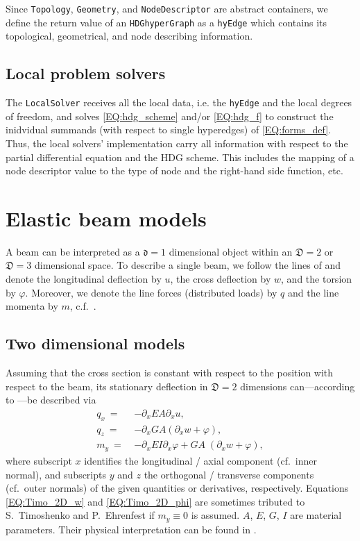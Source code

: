 \documentclass[a4paper, english, 12pt, reqno, draft]{amsart}
\theoremstyle{definition}
\theoremstyle{remark}
\numberwithin{equation}{section}
\newcommand{\locDim}{\ensuremath{\mathfrak d}}
\newcommand{\globDim}{\ensuremath{\mathfrak D}}
\newcommand{\code}[1]{\texttt{#1}}
\newcommand{\longDef}{\ensuremath{u}}
\newcommand{\crossDef}{\ensuremath{w}}
\newcommand{\torsion}{\ensuremath{\varphi}}
\newcommand{\force}{\ensuremath{q}}
\newcommand{\momentum}{\ensuremath{m}}
\begin{document}
Since \code{Topology}, \code{Geometry}, and \code{NodeDescriptor} are abstract containers, we define the return value of an \code{HDGhyperGraph} as a \code{hyEdge} which contains its topological, geometrical, and node describing information.
% 
\subsection{Local problem solvers}
% 
The \code{LocalSolver} receives all the local data, i.e. the \code{hyEdge} and the local degrees of freedom, and solves \eqref{EQ:hdg_scheme} and/or \eqref{EQ:hdg_f} to construct the inidvidual summands (with respect to single hyperedges) of \eqref{EQ:forms_def}. Thus, the local solvers' implementation carry all information with respect to the partial differential equation and the HDG scheme. This includes the mapping of a node descriptor value to the type of node and the right-hand side function, etc.
% 
\section{Elastic beam models}
% 
A beam can be interpreted as a $\locDim = 1$ dimensional object within an $\globDim = 2$ or $\globDim = 3$ dimensional space. To describe a single beam, we follow the lines of \cite[Sect.~1.2.3]{MeskourisH2013} and denote the longitudinal deflection by $\longDef$, the cross deflection by $\crossDef$, and the torsion by $\torsion$. Moreover, we denote the line forces (distributed loads) by $\force$ and the line momenta by $\momentum$, c.f.~\cite[Sect.~1.2.2]{MeskourisH2013}.
% 
\subsection{Two dimensional models}
% 
Assuming that the cross section is constant with respect to the position with respect to the beam, its stationary deflection in $\globDim = 2$ dimensions can---according to \cite[Sect.~1.4.3]{MeskourisH2013}---be described via
% 
\begin{subequations}\label{EQ:Timo_2D}
 \begin{align}
  \force_x ~=~ & - \partial_x EA \partial_x \longDef, \label{EQ:beam_long_Timo}\\
  \force_z ~=~ & - \partial_x GA ( \partial_x \crossDef + \torsion ), \label{EQ:Timo_2D_w}\\
  \momentum_y ~=~ & - \partial_x EI \partial_x \torsion + GA \; ( \partial_x \crossDef + \torsion ), \label{EQ:Timo_2D_phi}
 \end{align}
\end{subequations}
% 
where subscript $x$ identifies the longitudinal / axial component (cf.~inner normal), and subscripts $y$ and $z$ the orthogonal / transverse components (cf.~outer normals) of the given quantities or derivatives, respectively. Equations  \eqref{EQ:Timo_2D_w} and \eqref{EQ:Timo_2D_phi} are sometimes tributed to S.~Timoshenko and P.~Ehrenfest if $\momentum_y \equiv 0$ is assumed. $A$, $E$, $G$, $I$ are material parameters. Their physical interpretation can be found in \cite[Sect.~1.3.3]{MeskourisH2013}.
\end{document}
